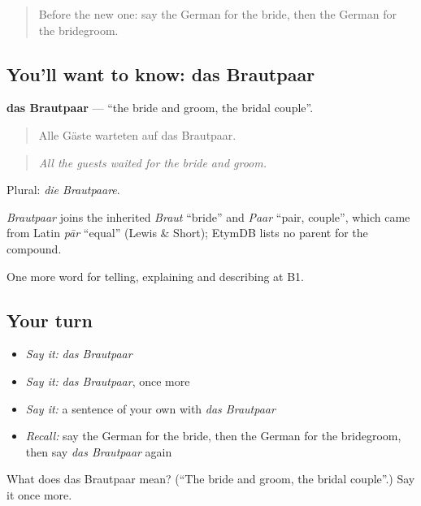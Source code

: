 \label{lesson:GE-C298-brautpaar}



\begin{quote}
Before the new one: say the German for the bride, then the German for the bridegroom.
\end{quote}

\subsection*{You'll want to know: das Brautpaar}
\textbf{das Brautpaar} — \textquotedblleft{}the bride and groom, the bridal couple\textquotedblright{}.

\begin{quote}
Alle Gäste warteten auf das Brautpaar.
\end{quote}

\begin{quote}
\emph{All the guests waited for the bride and groom.}
\end{quote}

Plural: \emph{die Brautpaare}.

\begin{cousinweb}
\emph{Brautpaar} joins the inherited \emph{Braut} \textquotedblleft{}bride\textquotedblright{} and \emph{Paar} \textquotedblleft{}pair, couple\textquotedblright{}, which came from Latin \emph{pār} \textquotedblleft{}equal\textquotedblright{} (Lewis \& Short); EtymDB lists no parent for the compound.
\end{cousinweb}

\begin{grammarlens}[title={What you've built}]
One more word for telling, explaining and describing at B1.
\end{grammarlens}

\subsection*{Your turn}
\begin{itemize}
\raggedright
  \item \emph{Say it:} \emph{das Brautpaar}
  \item \emph{Say it:} \emph{das Brautpaar}, once more
  \item \emph{Say it:} a sentence of your own with \emph{das Brautpaar}
  \item \emph{Recall:} say the German for the bride, then the German for the bridegroom, then say \emph{das Brautpaar} again
\end{itemize}

\begin{tcolorbox}[breakable,colback=teal!4,colframe=teal!35!black,title={Before you move on}]
What does das Brautpaar mean? (\textquotedblleft{}The bride and groom, the bridal couple\textquotedblright{}.) Say it once more.
\end{tcolorbox}
